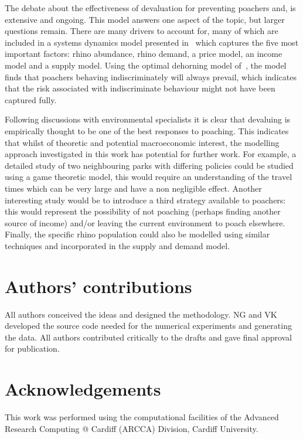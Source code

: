\documentclass[10pt]{article}
\begin{document}
The debate about the effectiveness of devaluation for preventing poachers and,
is extensive and ongoing. This model answers
one aspect of the topic, but larger questions remain. There are many drivers to
account for, many of which are included in a systems dynamics model presented
in~\cite{crookes2016trading} which captures the five most important factors:
rhino abundance, rhino demand, a price model, an income model and a supply
model. Using the optimal dehorning model of~\cite{Milner1992}, the
model~\cite{crookes2016trading} finds that poachers behaving
indiscriminately will always prevail, which indicates that the risk associated
with indiscriminate behaviour might not have been captured fully.

Following discussions with environmental specialists it is clear that devaluing
is empirically thought to be one of the best responses to poaching. This
indicates that whilst of theoretic and potential macroeconomic interest, the
modelling approach investigated in this work has potential for further work. For
example, a detailed study of two neighbouring parks with differing policies
could be studied using a game theoretic model, this would require an
understanding of the travel times which can be very large and have a non
negligible effect. Another interesting study would
be to introduce a third strategy available to poachers: this would represent the
possibility of not poaching (perhaps finding another source of income) and/or
leaving the current environment to poach elsewhere. Finally, the specific rhino
population could also be modelled using similar techniques and incorporated in
the supply and demand model.

\section*{Authors' contributions}

All authors conceived the ideas and designed the methodology. NG and VK developed the
source code needed for the numerical experiments and generating the data. All authors
contributed critically to the drafts and gave final approval for publication.

\section*{Acknowledgements}

This work was performed using the computational facilities of the Advanced
Research Computing @ Cardiff (ARCCA) Division, Cardiff University.
\end{document}
